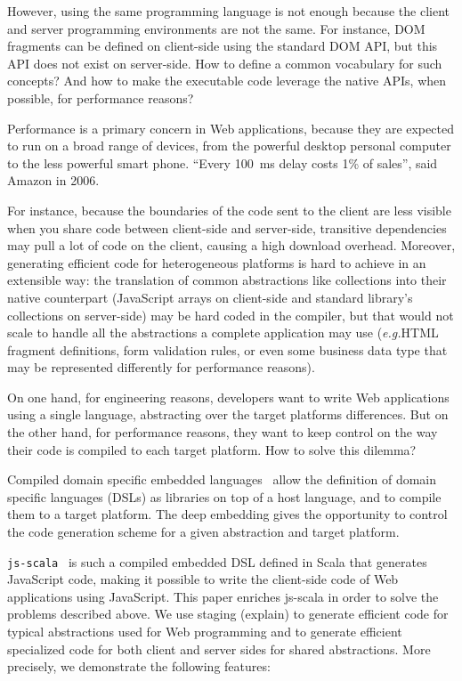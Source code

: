 \documentclass[preprint]{sigplanconf}
\newcommand{\eg}{\emph{e.g.}}
\begin{document}
However, using the same programming language is not enough because the client and server programming environments
are not the same. For instance, DOM fragments can be defined on client-side using the standard DOM API, but this
API does not exist on server-side. How to define a common vocabulary for such concepts? And how to make the
executable code leverage the native APIs, when possible, for performance reasons?

Performance is a primary concern in Web applications, because they are expected to run on a broad range of devices,
from the powerful desktop personal computer to the less powerful smart phone. “Every 100~ms delay costs 1\% of
sales”, said Amazon in 2006.

For instance, because the boundaries of the code sent to the client are less visible when you share code between
client-side and server-side, transitive dependencies may pull a lot of code on the client, causing a high download
overhead. Moreover, generating efficient code for heterogeneous platforms is hard to achieve in an extensible way:
the translation of common abstractions like collections into their native counterpart (JavaScript arrays on
client-side and standard library's collections on server-side) may be hard coded in the compiler, but that would not
scale to handle all the abstractions a complete application may use (\eg HTML fragment definitions, form validation
rules, or even some business data type that may be represented differently for performance reasons).

On one hand, for engineering reasons, developers want to write Web applications using a single language, abstracting
over the target platforms differences. But on the other hand, for performance reasons, they want to keep
control on the way their code is compiled to each target platform. How to solve this dilemma?

Compiled domain specific embedded languages~\cite{Elliott2003_Compiling} allow the definition of domain specific
languages (DSLs) as libraries on top of a host language, and to compile them to a target platform. The deep embedding
gives the opportunity to control the code generation scheme for a given abstraction and target platform.

\texttt{js-scala}~\cite{Kossakowski12_JsDESL} is such a compiled embedded DSL defined in Scala that generates
JavaScript code, making it possible to write the client-side code of Web applications using JavaScript. This paper
enriches js-scala in order to solve the problems described above. We use staging (explain) to generate efficient code
for typical abstractions used for Web programming and to generate efficient specialized code for both client and
server sides for shared abstractions. More precisely, we demonstrate the following features:
\end{document}
